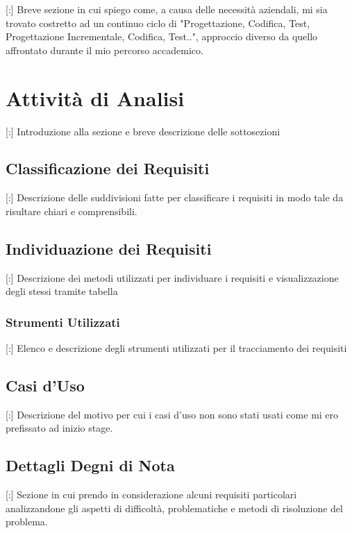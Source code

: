 \documentclass[11pt]{book}              %
\begin{document}
[:] Breve sezione in cui spiego come, a causa delle necessità aziendali, mi sia trovato costretto ad un continuo ciclo di "Progettazione, Codifica, Test, Progettazione Incrementale, Codifica, Test..", approccio diverso da quello affrontato durante il mio percorso accademico.

\section{Attività di Analisi}
[:] Introduzione alla sezione e breve descrizione delle sottosezioni


\subsection{Classificazione dei Requisiti}

[:] Descrizione delle suddivisioni fatte per classificare i requisiti in modo tale da risultare chiari e comprensibili.


\subsection{Individuazione dei Requisiti}

[:] Descrizione dei metodi utilizzati per individuare i requisiti e visualizzazione degli stessi tramite tabella

\subsubsection{Strumenti Utilizzati}

[:] Elenco e descrizione degli strumenti utilizzati per il tracciamento dei requisiti

\subsection{Casi d'Uso}

[:] Descrizione del motivo per cui i casi d'uso non sono stati usati come mi ero prefissato ad inizio stage.

\subsection{Dettagli Degni di Nota}

[:] Sezione in cui prendo in considerazione alcuni requisiti particolari analizzandone gli aspetti di difficoltà, problematiche e metodi di risoluzione del problema.
\end{document}
